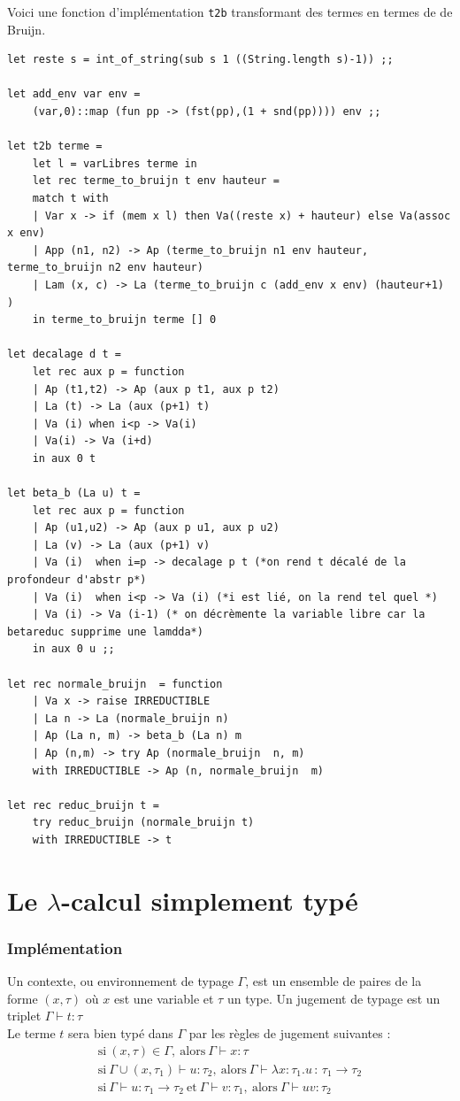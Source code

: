 \documentclass[11pt]{book}
\begin{document}
Voici une fonction d'implémentation \verb+t2b+ transformant des termes en termes de de Bruijn.
\begin{Verbatim}
let reste s = int_of_string(sub s 1 ((String.length s)-1)) ;;

let add_env var env =
	(var,0)::map (fun pp -> (fst(pp),(1 + snd(pp)))) env ;;

let t2b terme =
	let l = varLibres terme in
	let rec terme_to_bruijn t env hauteur =
	match t with
	| Var x -> if (mem x l) then Va((reste x) + hauteur) else Va(assoc x env)
	| App (n1, n2) -> Ap (terme_to_bruijn n1 env hauteur, terme_to_bruijn n2 env hauteur) 
	| Lam (x, c) -> La (terme_to_bruijn c (add_env x env) (hauteur+1) )
	in terme_to_bruijn terme [] 0

let decalage d t =
	let rec aux p = function
	| Ap (t1,t2) -> Ap (aux p t1, aux p t2) 
	| La (t) -> La (aux (p+1) t)
	| Va (i) when i<p -> Va(i)
	| Va(i) -> Va (i+d)
	in aux 0 t

let beta_b (La u) t =
	let rec aux p = function
	| Ap (u1,u2) -> Ap (aux p u1, aux p u2)
	| La (v) -> La (aux (p+1) v)
	| Va (i)  when i=p -> decalage p t (*on rend t décalé de la profondeur d'abstr p*)
	| Va (i)  when i<p -> Va (i) (*i est lié, on la rend tel quel *)
	| Va (i) -> Va (i-1) (* on décrèmente la variable libre car la betareduc supprime une lamdda*)
	in aux 0 u ;;

let rec normale_bruijn  = function
	| Va x -> raise IRREDUCTIBLE
	| La n -> La (normale_bruijn n)
	| Ap (La n, m) -> beta_b (La n) m
	| Ap (n,m) -> try Ap (normale_bruijn  n, m)
	with IRREDUCTIBLE -> Ap (n, normale_bruijn  m)

let rec reduc_bruijn t =
	try reduc_bruijn (normale_bruijn t)
	with IRREDUCTIBLE -> t 
\end{Verbatim}

\section{Le $\lambda$-calcul simplement typé}
\subsubsection{Implémentation}
Un contexte, ou environnement de typage $\Gamma$, est un ensemble de paires de la forme 
$( x , \tau )$  où $x$ est une variable et $\tau$ un type.
 Un jugement de typage est un triplet $\Gamma \vdash t:\tau$  \\

 Le terme $t$ sera bien typé dans $\Gamma$  par les règles de jugement suivantes :
\begin{gather*}
  \mathrm{si}\ (x,\tau ) \in \Gamma  ,\  \mathrm{alors}\ \Gamma \vdash x:\tau  \\
  \mathrm{si}\  \Gamma \cup (x,\tau _{1})\vdash u:\tau _{2},\  \mathrm{alors}\ \Gamma \vdash \lambda x\!:\!\tau _{1}.u\,:\,\tau _{1}\rightarrow \tau _{2} \\
  \mathrm{si}\ \Gamma \vdash u:\tau _{1}\rightarrow \tau _{2}\ \mathrm{et}\ \Gamma \vdash v:\tau _{1},\  
    \mathrm{alors}\  \Gamma \vdash uv:\tau _{2} \\ 
\end{gather*}
  
\end{document}
